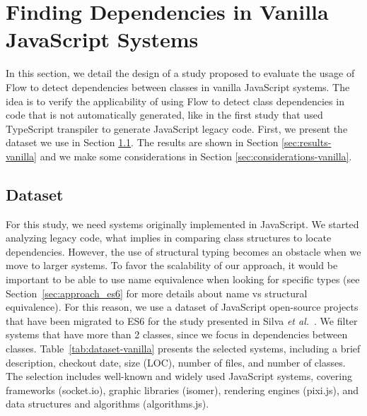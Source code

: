 \documentclass[review]{elsarticle}
\newcommand{\ab}[1]{\nb{Alexandre}{blue}{#1}}
\begin{document}
\section{Finding Dependencies in Vanilla JavaScript Systems}
\label{sec:study-design-vanilla}

In this section, we detail the design of a study proposed to evaluate the usage of Flow to detect dependencies between classes in vanilla JavaScript systems. The idea is to verify the applicability of using Flow to detect class dependencies in code that is not automatically generated, like in the first study that used TypeScript transpiler to generate JavaScript legacy code. First, we present the dataset we use in Section \ref{sec:dataset-vanilla}. The results are shown in Section \ref{sec:results-vanilla} and we make some considerations in Section \ref{sec:considerations-vanilla}.


\subsection{Dataset}
\label{sec:dataset-vanilla}

For this study, we need systems originally implemented in JavaScript. We started analyzing legacy code, what implies in comparing class structures to locate dependencies. However, the use of structural typing becomes an obstacle when we move to larger systems\ab{Why?}. To favor the scalability of our approach, it would be important to be able to use name equivalence when looking for specific types (see Section~\ref{sec:approach_es6} for more details about name vs structural equivalence). For this reason, we use a dataset of JavaScript open-source projects that have been migrated to ES6 for the study presented in Silva \emph{et al.}~\cite{icsr2017}. We filter systems that have more than 2 classes, since we focus in dependencies between classes. Table~\ref{tab:dataset-vanilla} presents the selected systems, including a brief description, checkout date, size (LOC), number of files, and number of classes. The selection includes well-known and widely used JavaScript systems, covering frameworks ({\sc socket.io}), graphic libraries ({\sc isomer}), rendering engines ({\sc pixi.js}), and data structures and algorithms ({\sc algorithms.js}). 
\end{document}
